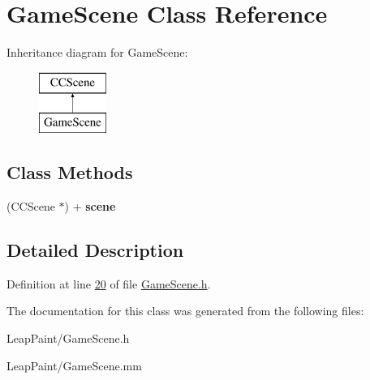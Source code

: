 \hypertarget{interface_game_scene}{\section{Game\-Scene Class Reference}
\label{d5/d01/interface_game_scene}
}
Inheritance diagram for Game\-Scene\-:\begin{figure}[H]
\begin{center}
\leavevmode
\includegraphics[height=2.000000cm]{d5/d01/interface_game_scene}
\end{center}
\end{figure}
\subsection*{Class Methods}
\begin{DoxyCompactItemize}
\item 
\hypertarget{interface_game_scene_a7198e3569faa9c3e586cd3dcd88b44fc}{(C\-C\-Scene $\ast$) + {\bfseries scene}}\label{d5/d01/interface_game_scene_a7198e3569faa9c3e586cd3dcd88b44fc}

\end{DoxyCompactItemize}


\subsection{Detailed Description}


Definition at line \hyperlink{_game_scene_8h_source_l00020}{20} of file \hyperlink{_game_scene_8h_source}{Game\-Scene.\-h}.



The documentation for this class was generated from the following files\-:\begin{DoxyCompactItemize}
\item 
Leap\-Paint/Game\-Scene.\-h\item 
Leap\-Paint/Game\-Scene.\-mm\end{DoxyCompactItemize}
